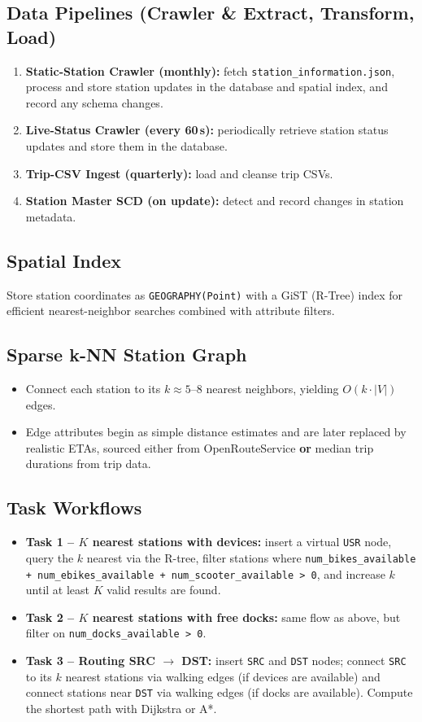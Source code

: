 \documentclass{article}
\begin{document}
\subsection{Data Pipelines (Crawler \& Extract, Transform, Load)}
\begin{enumerate}[label=3.1.\arabic*]
  \item \textbf{Static-Station Crawler (monthly):} fetch \texttt{station\_information.json}, process and store station updates in the database and spatial index, and record any schema changes.
  \item \textbf{Live-Status Crawler (every 60\,s):} periodically retrieve station status updates and store them in the database.
  \item \textbf{Trip-CSV Ingest (quarterly):} load and cleanse trip CSVs.
  \item \textbf{Station Master SCD (on update):} detect and record changes in station metadata.
\end{enumerate}

\subsection{Spatial Index}
Store station coordinates as \texttt{GEOGRAPHY(Point)} with a GiST (R-Tree) index for efficient nearest-neighbor searches combined with attribute filters.

\subsection{Sparse k-NN Station Graph}
\begin{itemize}
  \item Connect each station to its $k \approx 5\text{--}8$ nearest neighbors, yielding $O(k\cdot |V|)$ edges.
  \item Edge attributes begin as simple distance estimates and are later replaced by realistic ETAs, sourced either from OpenRouteService \textbf{or} median trip durations from trip data.
\end{itemize}

\subsection{Task Workflows}
\begin{itemize}
  \item \textbf{Task 1 -- $K$ nearest stations with devices:} insert a virtual \texttt{USR} node, query the $k$ nearest via the R-tree, filter stations where \texttt{num\_bikes\_available + num\_ebikes\_available + num\_scooter\_available > 0}, and increase $k$ until at least $K$ valid results are found.
  \item \textbf{Task 2 -- $K$ nearest stations with free docks:} same flow as above, but filter on \texttt{num\_docks\_available > 0}.
  \item \textbf{Task 3 -- Routing SRC $\to$ DST:} insert \texttt{SRC} and \texttt{DST} nodes; connect \texttt{SRC} to its $k$ nearest stations via walking edges (if devices are available) and connect stations near \texttt{DST} via walking edges (if docks are available). Compute the shortest path with Dijkstra or A*.
\end{itemize}
\end{document}
